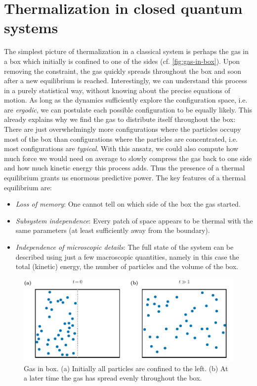 \section{Thermalization in closed quantum systems}
\label{sec:Thermalization-in-closed-QS}
The simplest picture of thermalization in a classical system is perhaps the gas in a box which initially is confined to one of the sides (cf. \autoref{fig:gas-in-box}). Upon removing the constraint, the gas quickly spreads throughout the box and soon after a new equilibrium is reached. Interestingly, we can understand this process in a purely statistical way, without knowing about the precise equations of motion. As long as the dynamics sufficiently explore the configuration space, i.e. are \emph{ergodic}, we can postulate each possible configuration to be equally likely. This already explains why we find the gas to distribute itself throughout the box: There are just overwhelmingly more configurations where the particles occupy most of the box than configurations where the particles are concentrated, i.e. most configurations are \emph{typical}. With this ansatz, we could also compute how much force we would need on average to slowly compress the gas back to one side and how much kinetic energy this process adds. Thus the presence of a thermal equilibrium grants us enormous predictive power.
The key features of a thermal equilibrium are:
\begin{itemize}
	\item \emph{Loss of memory}: One cannot tell on which side of the box the gas started.
	\item \emph{Subsystem independence}: Every patch of space appears to be thermal with the same parameters (at least sufficiently away from the boundary).
	\item \emph{Independence of microscopic details}: The full state of the system can be described using just a few macroscopic quantities, namely in this case the total (kinetic) energy, the number of particles and the volume of the box.
\end{itemize}

\begin{figure}[htb]
	\centering
	\includegraphics[]{gfx/part1/gas-in-box}
	\caption{Gas in box. (a) Initially all particles are confined to the left. (b) At a later time the gas has spread evenly throughout the box.}
	\label{fig:gas-in-box}
\end{figure}

